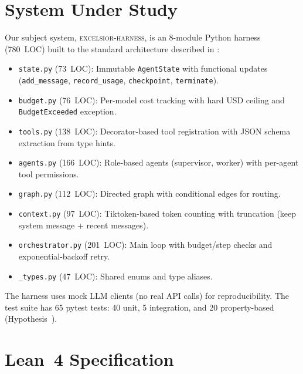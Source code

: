 \documentclass[11pt,a4paper]{article}
\begin{document}
\section{System Under Study}
\label{sec:system}

Our subject system, \textsc{excelsior-harness}, is an 8-module
Python harness (780~LOC) built to the standard architecture
described in :

\begin{itemize}[nosep]
  \item \texttt{state.py} (73~LOC): Immutable \texttt{AgentState}
    with functional updates (\texttt{add\_message},
    \texttt{record\_usage}, \texttt{checkpoint}, \texttt{terminate}).
  \item \texttt{budget.py} (76~LOC): Per-model cost tracking with
    hard USD ceiling and \texttt{BudgetExceeded} exception.
  \item \texttt{tools.py} (138~LOC): Decorator-based tool
    registration with JSON schema extraction from type hints.
  \item \texttt{agents.py} (166~LOC): Role-based agents
    (supervisor, worker) with per-agent tool permissions.
  \item \texttt{graph.py} (112~LOC): Directed graph with
    conditional edges for routing.
  \item \texttt{context.py} (97~LOC): Tiktoken-based token counting
    with truncation (keep system message + recent messages).
  \item \texttt{orchestrator.py} (201~LOC): Main loop with
    budget/step checks and exponential-backoff retry.
  \item \texttt{\_types.py} (47~LOC): Shared enums and type aliases.
\end{itemize}

The harness uses mock LLM clients (no real API calls) for
reproducibility. The test suite has 65 pytest tests: 40 unit,
5 integration, and 20 property-based
(Hypothesis~\cite{hypothesis2024}).

\section{Lean~4 Specification}
\label{sec:spec}
\end{document}
